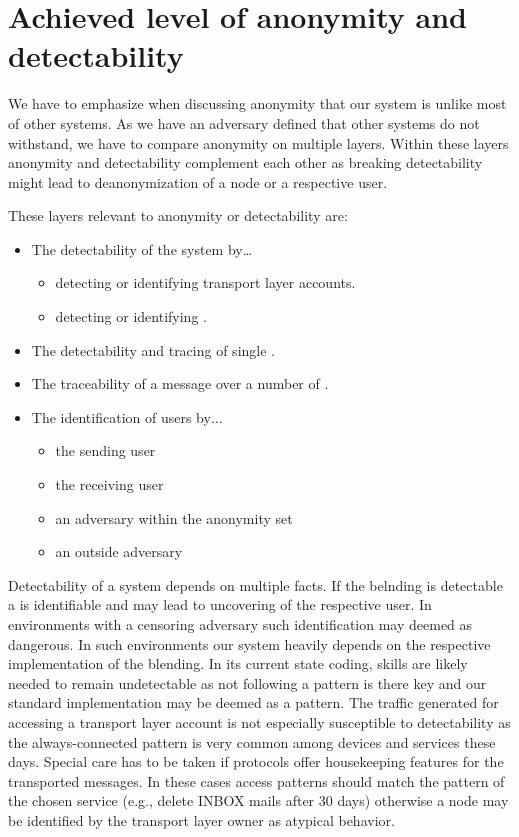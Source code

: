 \section{Achieved level of anonymity and detectability}
We have to emphasize when discussing anonymity that our system is unlike most of other systems. As we have an adversary defined that other systems do not withstand, we have to compare anonymity on multiple layers. Within these layers anonymity and detectability complement each other as breaking detectability might lead to deanonymization of a node or a respective user. 

These layers relevant to anonymity or detectability are:
\begin{itemize}
	\item The detectability of the system by\ldots
	\begin{itemize}
		\item detecting or identifying transport layer accounts.
		\item detecting or identifying \VortexNodes{}.
	\end{itemize}
	\item The detectability and tracing of single \VortexMessages.
	\item The traceability of a message over a number of \VortexNodes{}.
	\item The identification of \MessageVortex{} users by$\ldots$
	\begin{itemize}
		\item the sending \MessageVortex{} user
		\item the receiving \MessageVortex{} user
		\item an adversary within the anonymity set
		\item an outside adversary
	\end{itemize}
\end{itemize} 

Detectability of a system depends on multiple facts. If the belnding is detectable a \VortexNode{} is identifiable and may lead to uncovering of the respective user. In environments with a censoring adversary such identification may deemed as dangerous. In such environments our system heavily depends on the respective implementation of the blending. In its current state coding, skills are likely needed to remain undetectable as not following a pattern is there key and our standard implementation may be deemed as a pattern. The traffic generated for accessing a transport layer account is not especially susceptible to detectability as the always-connected pattern is very common among devices and services these days. Special care has to be taken if protocols offer housekeeping features for the transported messages. In these cases access patterns should match the pattern of the chosen service (e.g., delete INBOX mails after 30 days) otherwise a node may be identified by the transport layer owner as atypical behavior.

